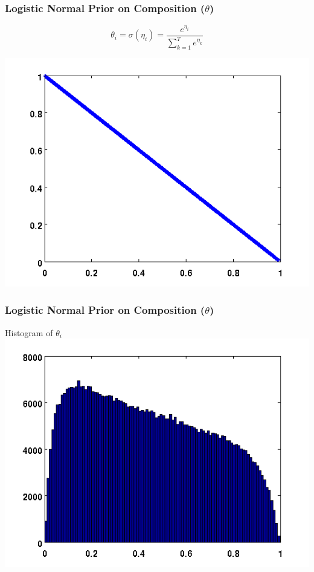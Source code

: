 \begin{frame}
  \frametitle{Logistic Normal Prior on Composition ($\theta$)}
  \begin{center}
    \vspace{-0.3in}
    \begin{equation*}
      \theta_i = \sigma(\eta_i) = \frac{e^{\eta_i}}{\sum_{k=1}^{T}e^{\eta_k}}
    \end{equation*}

    \includegraphics[scale=0.5]{img/log-normal-figs/log-normal-1.png}
  \end{center}
\end{frame}

\begin{frame}
  \frametitle{Logistic Normal Prior on Composition ($\theta$)}
  \begin{center}
    Histogram of $\theta_i$
    \includegraphics[scale=0.6]{img/log-normal-figs/hist-1.png}
  \end{center}
\end{frame}

